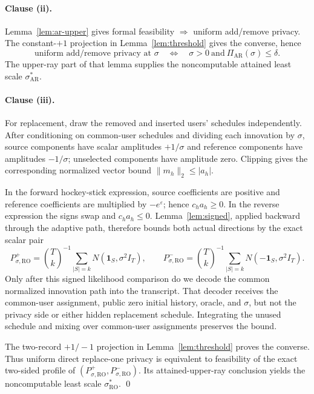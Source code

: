 \documentclass[11pt]{article}
\theoremstyle{remark}
\begin{document}
\paragraph{Clause (ii).}
Lemma~\ref{lem:ar-upper} gives formal feasibility $\Rightarrow$ uniform
add/remove privacy.  The constant-$+1$ projection in
Lemma~\ref{lem:threshold} gives the converse, hence
\[
 \text{uniform add/remove privacy at }\sigma
 \quad\Longleftrightarrow\quad
 \sigma>0\ \text{and}\ \Pi_{\mathrm{AR}}(\sigma)\leq\delta.
\]
The upper-ray part of that lemma supplies the noncomputable attained least
scale $\sigma_{\mathrm{AR}}^*$.

\paragraph{Clause (iii).}
For replacement, draw the removed and inserted users' schedules independently.
After conditioning on common-user schedules and dividing each innovation by
$\sigma$, source components have scalar amplitudes $+1/\sigma$ and reference
components have amplitudes $-1/\sigma$; unselected components have amplitude
zero.  Clipping gives the corresponding normalized vector bound
$\|m_h\|_2\leq|a_h|$.

In the forward hockey-stick expression, source coefficients are positive and
reference coefficients are multiplied by $-e^\varepsilon$; hence
$c_ha_h\geq0$.  In the reverse expression the signs swap and
$c_ha_h\leq0$.  Lemma~\ref{lem:signed}, applied backward through the adaptive
path, therefore bounds both actual directions by the exact scalar pair
\[
 P_{\sigma,\mathrm{RO}}^+
 =\binom Tk^{-1}\sum_{|S|=k}N(\mathbf1_S,\sigma^2I_T),
 \qquad
 P_{\sigma,\mathrm{RO}}^-
 =\binom Tk^{-1}\sum_{|S|=k}N(-\mathbf1_S,\sigma^2I_T).
\]
Only after this signed likelihood comparison do we decode the common
normalized innovation path into the transcript.  That decoder receives the
common-user assignment, public zero initial history, oracle, and $\sigma$, but
not the privacy side or either hidden replacement schedule.  Integrating the
unused schedule and mixing over common-user assignments preserves the bound.

The two-record $+1/-1$ projection in Lemma~\ref{lem:threshold} proves the
converse.  Thus uniform direct replace-one privacy is equivalent to feasibility
of the exact two-sided profile of
$(P_{\sigma,\mathrm{RO}}^+,P_{\sigma,\mathrm{RO}}^-)$.  Its attained-upper-ray
conclusion yields the noncomputable least scale $\sigma_{\mathrm{RO}}^*$.
\qed
\end{document}
